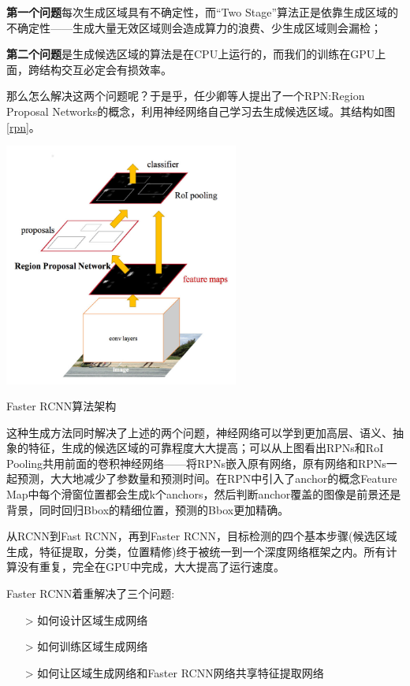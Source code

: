 \textbf{第一个问题}每次生成区域具有不确定性，而“Two Stage”算法正是依靠生成区域的不确定性——生成大量无效区域则会造成算力的浪费、少生成区域则会漏检；

\textbf{第二个问题}是生成候选区域的算法是在CPU上运行的，而我们的训练在GPU上面，跨结构交互必定会有损效率。

那么怎么解决这两个问题呢？于是乎，任少卿等人提出了一个RPN:Region Proposal Networks的概念，利用神经网络自己学习去生成候选区域。其结构如图\ref{rpn}。
\begin{uscfigure}
	\includegraphics[width=\textwidth,height=8cm]{./Pictures/faster_rcnn.jpg}	
	\caption{Faster RCNN算法架构}	
	\label{rpn}
\end{uscfigure}
这种生成方法同时解决了上述的两个问题，神经网络可以学到更加高层、语义、抽象的特征，生成的候选区域的可靠程度大大提高；可以从上图看出RPNs和RoI Pooling共用前面的卷积神经网络——将RPNs嵌入原有网络，原有网络和RPNs一起预测，大大地减少了参数量和预测时间。在RPN中引入了anchor的概念Feature　Map中每个滑窗位置都会生成k个anchors，然后判断anchor覆盖的图像是前景还是背景，同时回归Bbox的精细位置，预测的Bbox更加精确。

从RCNN到Fast RCNN，再到Faster RCNN，目标检测的四个基本步骤(候选区域生成，特征提取，分类，位置精修)终于被统一到一个深度网络框架之内。所有计算没有重复，完全在GPU中完成，大大提高了运行速度。

Faster RCNN着重解决了三个问题:

\line
\begin{itemize}
	\setlength{\itemsep}{0pt}
	\setlength{\parsep}{0pt}
	\setlength{\parskip}{0pt}
	\item[>] 如何设计区域生成网络
	\item[>] 如何训练区域生成网络
	\item[>] 如何让区域生成网络和Faster RCNN网络共享特征提取网络
\end{itemize}
\line

